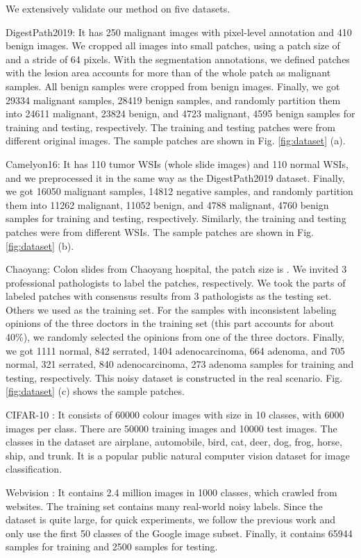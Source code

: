 We extensively validate our method on {five} datasets. 
\begin{enumerate}
\item DigestPath2019: It has 250 malignant images with pixel-level annotation and 410 benign images. We cropped all images into small patches, using a patch size of  and a stride of 64 pixels. {With the segmentation annotations, we defined patches with the lesion area accounts for more than  of the whole patch as malignant samples. All benign samples were cropped from benign images.} Finally, we got 29334 malignant samples, 28419 benign samples, and randomly partition them into 24611 malignant, 23824 benign, and 4723 malignant, 4595 benign samples for training and testing, respectively. The training and testing patches were from different original images. The sample patches are shown in Fig. \ref{fig:dataset} (a).
\item Camelyon16: It has 110 tumor WSIs (whole slide images) and 110 normal WSIs, and we preprocessed it in the same way as the DigestPath2019 dataset. Finally, we got 16050 malignant samples, 14812 negative samples, and randomly partition them into 11262 malignant, 11052 benign, and 4788 malignant, 4760 benign samples for training and testing, respectively. Similarly, the training and testing patches were from different WSIs. The sample patches are shown in Fig. \ref{fig:dataset} (b).
\item Chaoyang: Colon slides from Chaoyang hospital, the patch size is . We invited 3 professional pathologists to label the patches, respectively. We took the parts of labeled patches with consensus results from 3 pathologists as the testing set. Others we used as the training set. For the samples with inconsistent labeling opinions of the three doctors in the training set {(this part accounts for about 40\%)}, we randomly selected the opinions from one of the three doctors. Finally, we got 1111 normal, 842 serrated, 1404 adenocarcinoma, 664 adenoma, and 705 normal, 321 serrated, 840 adenocarcinoma, 273 adenoma samples for training and testing, respectively. This noisy dataset is constructed in the real scenario. Fig. \ref{fig:dataset} (c) shows the sample patches.
{
\item CIFAR-10 \cite{2009Learning}: It consists of 60000 colour images with size  in 10 classes, with 6000 images per class. There are 50000 training images and 10000 test images. The classes in the dataset are airplane, automobile, bird, cat, deer, dog, frog, horse, ship, and trunk. It is a popular public natural computer vision dataset for image classification.
}
{\item Webvision \cite{2017WebVision}: It contains 2.4 million images in 1000 classes, which crawled from websites. The training set contains many real-world noisy labels. Since the dataset is quite large, for quick experiments, we follow the previous work\cite{chen2019understanding} and only use the first 50 classes of the Google image subset. Finally, it contains 65944 samples for training and 2500 samples for testing.
}
\end{enumerate}

